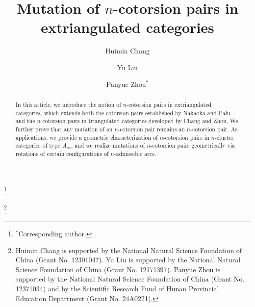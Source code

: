 \documentclass[a4paper,reqno,11pt]{amsart}
\newcommand{\cal}{\mathcal}
\theoremstyle{definition}
\begin{document}

\title{Mutation of $n$-cotorsion pairs in extriangulated categories}

\author[Chang]{Huimin Chang}
\address{Department of Applied Mathematics,
The Open University of China,
100039 Beijing,
P. R. China
}

\author[Liu]{Yu Liu}
\address{ School of Mathematics and Statistics, Shaanxi Normal University, 710062 Xi'an, Shannxi, P. R. China}

\author[Zhou]{Panyue Zhou$^\ast$}
\address{School of Mathematics and Statistics, Changsha University of Science and Technology, 410114 Changsha, Hunan,  P. R. China}

\thanks{$^\ast$Corresponding author.}


\begin{abstract}
In this article, we introduce the notion of $n$-cotorsion pairs in extriangulated categories, which extends both the cotorsion pairs established by Nakaoka and Palu and the $n$-cotorsion pairs in triangulated categories developed by Chang and Zhou. We further prove that any mutation of an $n$-cotorsion pair remains an $n$-cotorsion pair.
As applications, we provide a geometric characterization of $n$-cotorsion pairs in $n$-cluster categories of type $A_{\infty}$,
and we realize mutations of
$n$-cotorsion pairs geometrically via rotations of certain configurations of
$n$-admissible arcs.
\end{abstract}





\thanks{Huimin Chang is supported by the National Natural Science Foundation of China (Grant No. 12301047). Yu Liu is supported by the National Natural Science Foundation of China (Grant No. 12171397). Panyue Zhou is supported by the National Natural Science Foundation of China (Grant No. 12371034) and by the Scientific Research Fund of Hunan Provincial Education Department (Grant No. 24A0221). }
\end{document}
